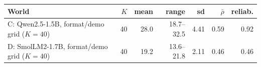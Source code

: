 \begin{tabular}{lrrrrrr}\toprule
World & $K$ & mean & range & sd & $\bar\rho$ & reliab. \\\midrule
C: Qwen2.5-1.5B, format/demo grid ($K{=}40$) & 40 & 28.0 & 18.7--32.5 & 4.41 & 0.59 & 0.92 \\
D: SmolLM2-1.7B, format/demo grid ($K{=}40$) & 40 & 19.2 & 13.6--21.8 & 2.11 & 0.46 & 0.46 \\
\bottomrule
\end{tabular}
